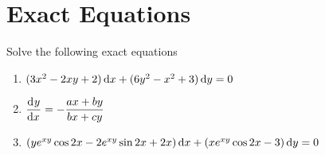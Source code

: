 \documentclass[fleqn, a4paper, 12pt, oneside]{amsart}
\theoremstyle{definition}
\theoremstyle{theorem}
\begin{document}
\part{Exact Equations}

\begin{question}
	Solve the following exact equations
	\begin{enumerate}[leftmargin=*]
		\item $(3x^2 - 2xy + 2) \dif x +( 6y^2 - x^2 + 3) \dif y = 0$
		\item $\dod{y}{x} = -\dfrac{ax + by}{bx + cy}$
		\item $\left( y e^{xy} \cos 2x - 2 e^{xy} \sin 2x + 2x \right) \dif x + \left( x e^{xy} \cos 2x - 3 \right) \dif y = 0$
	\end{enumerate}
\end{question}
\end{document}

